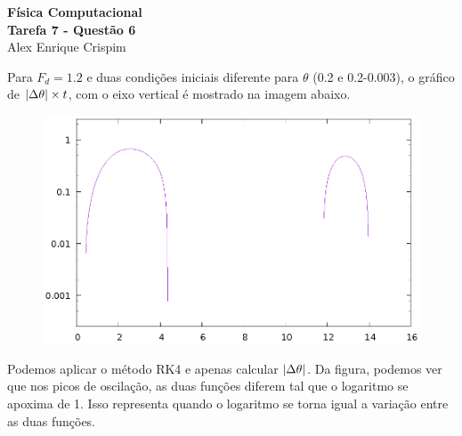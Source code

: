 


  \begin{center}
    \LARGE \textbf{Física Computacional} \\
    \Large \textbf{Tarefa 7 - Questão 6} \\
    \large Alex Enrique Crispim
  \end{center}

  Para $F_d = 1.2$ e duas condições iniciais diferente para $\theta$ (0.2 e 0.2-0.003), o gráfico de $\abs{\Delta \theta} \times t$, com o eixo vertical é mostrado na imagem abaixo.

  \begin{figure}[h]
    \includegraphics{LogDif}
  \end{figure}

  Podemos aplicar o método RK4 e apenas calcular $\abs{\Delta \theta}$. Da figura, podemos ver que nos picos de oscilação, as duas funções diferem tal que o logaritmo se apoxima de 1. Isso representa quando o logaritmo se torna igual a variação entre as duas funções. 



